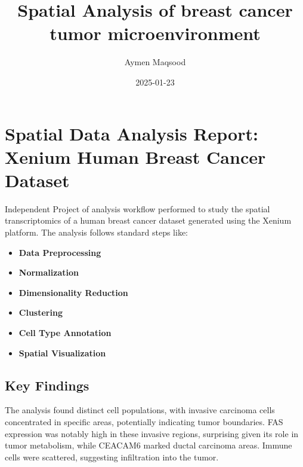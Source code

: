 \documentclass[
]{article}
\title{Spatial Analysis of breast cancer tumor microenvironment}
\author{Aymen Maqsood}
\date{2025-01-23}
\newenvironment{Shaded}{\begin{snugshade}}{\end{snugshade}}
\newcommand{\AttributeTok}[1]{\textcolor[rgb]{0.13,0.29,0.53}{#1}}
\newcommand{\CommentTok}[1]{\textcolor[rgb]{0.56,0.35,0.01}{\textit{#1}}}
\newcommand{\ConstantTok}[1]{\textcolor[rgb]{0.56,0.35,0.01}{#1}}
\newcommand{\FunctionTok}[1]{\textcolor[rgb]{0.13,0.29,0.53}{\textbf{#1}}}
\newcommand{\NormalTok}[1]{#1}
\newcommand{\SpecialCharTok}[1]{\textcolor[rgb]{0.81,0.36,0.00}{\textbf{#1}}}
\providecommand{\tightlist}{%
  \setlength{\itemsep}{0pt}\setlength{\parskip}{0pt}}
\begin{document}
\maketitle

\begin{Shaded}
\end{Shaded}

\section{Spatial Data Analysis Report: Xenium Human Breast Cancer
Dataset}\label{spatial-data-analysis-report-xenium-human-breast-cancer-dataset}

Independent Project of analysis workflow performed to study the spatial
transcriptomics of a human breast cancer dataset generated using the
Xenium platform. The analysis follows standard steps like:

\begin{itemize}
\tightlist
\item
  \textbf{Data Preprocessing}
\item
  \textbf{Normalization}
\item
  \textbf{Dimensionality Reduction}
\item
  \textbf{Clustering}
\item
  \textbf{Cell Type Annotation}
\item
  \textbf{Spatial Visualization}
\end{itemize}

\subsection{Key Findings}\label{key-findings}

The analysis found distinct cell populations, with invasive carcinoma
cells concentrated in specific areas, potentially indicating tumor
boundaries. FAS expression was notably high in these invasive regions,
surprising given its role in tumor metabolism, while CEACAM6 marked
ductal carcinoma areas. Immune cells were scattered, suggesting
infiltration into the tumor.
\end{document}
